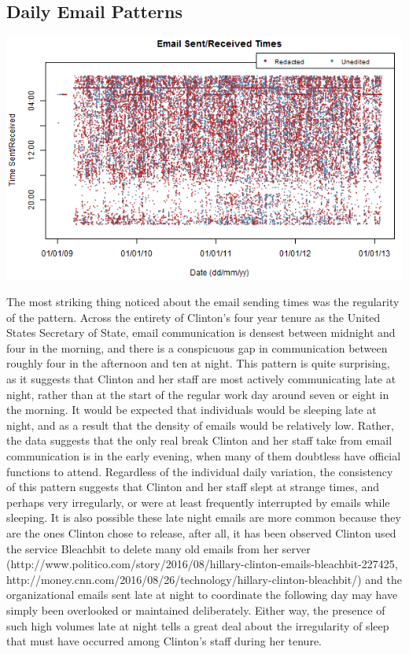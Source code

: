 \documentclass[journal]{vgtc}                %
\begin{document}
\subsection{Daily Email Patterns}

\includegraphics{SentReceivedEntireTenure}

The most striking thing noticed about the email sending times was the regularity of the pattern. Across the entirety of Clinton's four year tenure as the United States Secretary of State, email communication is densest between midnight and four in the morning, and there is a conspicuous gap in communication between roughly four in the afternoon and ten at night. This pattern is quite surprising, as it suggests that Clinton and her staff are most actively communicating late at night, rather than at the start of the regular work day around seven or eight in the morning. It would be expected that individuals would be sleeping late at night, and as a result that the density of emails would be relatively low. Rather, the data suggests that the only real break Clinton and her staff take from email communication is in the early evening, when many of them doubtless have official functions to attend. Regardless of the individual daily variation, the consistency of this pattern suggests that Clinton and her staff slept at strange times, and perhaps very irregularly, or were at least frequently interrupted by emails while sleeping. It is also possible these late night emails are more common because they are the ones Clinton chose to release, after all, it has been observed Clinton used the service Bleachbit to delete many old emails from her server (http://www.politico.com/story/2016/08/hillary-clinton-emails-bleachbit-227425, http://money.cnn.com/2016/08/26/technology/hillary-clinton-bleachbit/) and the organizational emails sent late at night to coordinate the following day may have simply been overlooked or maintained deliberately. Either way, the presence of such high volumes late at night tells a great deal about the irregularity of sleep that must have occurred among Clinton's staff during her tenure.
\end{document}
